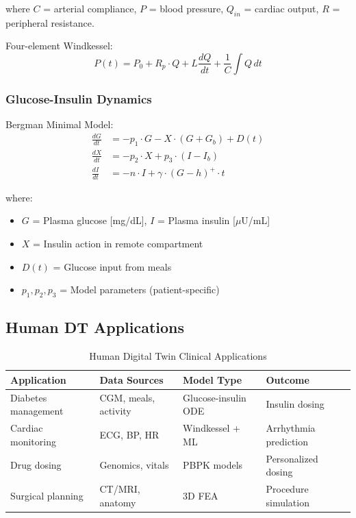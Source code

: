 \documentclass[12pt,a4paper]{article}
\begin{document}
where $C$ = arterial compliance, $P$ = blood pressure, $Q_{in}$ = cardiac output, $R$ = peripheral resistance.

Four-element Windkessel:
\begin{equation}
P(t) = P_0 + R_p \cdot Q + L\frac{dQ}{dt} + \frac{1}{C}\int Q \, dt
\end{equation}

\subsubsection{Glucose-Insulin Dynamics}

Bergman Minimal Model:
\begin{align}
\frac{dG}{dt} &= -p_1 \cdot G - X \cdot (G + G_b) + D(t) \\
\frac{dX}{dt} &= -p_2 \cdot X + p_3 \cdot (I - I_b) \\
\frac{dI}{dt} &= -n \cdot I + \gamma \cdot (G - h)^+ \cdot t
\end{align}

where:
\begin{itemize}
    \item $G$ = Plasma glucose [mg/dL], $I$ = Plasma insulin [$\mu$U/mL]
    \item $X$ = Insulin action in remote compartment
    \item $D(t)$ = Glucose input from meals
    \item $p_1, p_2, p_3$ = Model parameters (patient-specific)
\end{itemize}

\subsection{Human DT Applications}

\begin{table}[H]
\centering
\caption{Human Digital Twin Clinical Applications}
\begin{tabular}{llll}
\toprule
\textbf{Application} & \textbf{Data Sources} & \textbf{Model Type} & \textbf{Outcome} \\
\midrule
Diabetes management & CGM, meals, activity & Glucose-insulin ODE & Insulin dosing \\
Cardiac monitoring & ECG, BP, HR & Windkessel + ML & Arrhythmia prediction \\
Drug dosing & Genomics, vitals & PBPK models & Personalized dosing \\
Surgical planning & CT/MRI, anatomy & 3D FEA & Procedure simulation \\
\bottomrule
\end{tabular}
\end{table}
\end{document}
